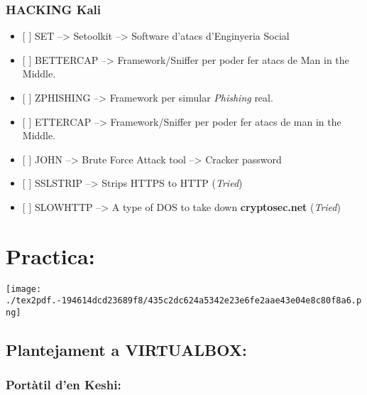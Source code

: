 \documentclass[]{article}
\providecommand{\tightlist}{%
  \setlength{\itemsep}{0pt}\setlength{\parskip}{0pt}}
\begin{document}
\hypertarget{hacking-kali}{%
\subsubsection{\texorpdfstring{\textbf{HACKING
Kali}}{HACKING Kali}}\label{hacking-kali}}

\begin{itemize}
\tightlist
\item
  {[} {]} SET --\textgreater{} Setoolkit --\textgreater{} Software
  d'atacs d'Enginyeria Social
\item
  {[} {]} BETTERCAP --\textgreater{} Framework/Sniffer per poder fer
  atacs de Man in the Middle.
\item
  {[} {]} ZPHISHING --\textgreater{} Framework per simular
  \emph{Phishing} real.
\item
  {[} {]} ETTERCAP --\textgreater{} Framework/Sniffer per poder fer
  atacs de man in the Middle.
\item
  {[} {]} JOHN --\textgreater{} Brute Force Attack tool --\textgreater{}
  Cracker password
\item
  {[} {]} SSLSTRIP --\textgreater{} Strips HTTPS to HTTP (\emph{Tried})
\item
  {[} {]} SLOWHTTP --\textgreater{} A type of DOS to take down
  \textbf{cryptosec.net} (\emph{Tried})
\end{itemize}

\hypertarget{practica}{%
\section{\texorpdfstring{\textbf{Practica:}}{Practica:}}\label{practica}}

\texttt{[image: ./tex2pdf.-194614dcd23689f8/435c2dc624a5342e23e6fe2aae43e04e8c80f8a6.png]}

\hypertarget{plantejament-a-virtualbox}{%
\subsection{\texorpdfstring{\textbf{Plantejament a
VIRTUALBOX}:}{Plantejament a VIRTUALBOX:}}\label{plantejament-a-virtualbox}}

\hypertarget{portuxe0til-den-keshi}{%
\subsubsection{\texorpdfstring{\textbf{Portàtil d'en
Keshi}:}{Portàtil d'en Keshi:}}\label{portuxe0til-den-keshi}}
\end{document}
